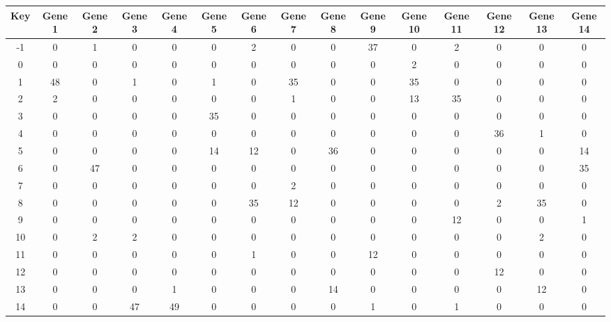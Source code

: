 \begin{tabular}{|c|c|c|c|c|c|c|c|c|c|c|c|c|c|c|}
\hline
Key & Gene 1 & Gene 2 & Gene 3 & Gene 4 & Gene 5 & Gene 6 & Gene 7 & Gene 8 & Gene 9 & Gene 10 & Gene 11 & Gene 12 & Gene 13 & Gene 14 \\
\hline
-1 & 0 & 1 & 0 & 0 & 0 & 2 & 0 & 0 & 37 & 0 & 2 & 0 & 0 & 0 \\
0 & 0 & 0 & 0 & 0 & 0 & 0 & 0 & 0 & 0 & 2 & 0 & 0 & 0 & 0 \\
1 & 48 & 0 & 1 & 0 & 1 & 0 & 35 & 0 & 0 & 35 & 0 & 0 & 0 & 0 \\
2 & 2 & 0 & 0 & 0 & 0 & 0 & 1 & 0 & 0 & 13 & 35 & 0 & 0 & 0 \\
3 & 0 & 0 & 0 & 0 & 35 & 0 & 0 & 0 & 0 & 0 & 0 & 0 & 0 & 0 \\
4 & 0 & 0 & 0 & 0 & 0 & 0 & 0 & 0 & 0 & 0 & 0 & 36 & 1 & 0 \\
5 & 0 & 0 & 0 & 0 & 14 & 12 & 0 & 36 & 0 & 0 & 0 & 0 & 0 & 14 \\
6 & 0 & 47 & 0 & 0 & 0 & 0 & 0 & 0 & 0 & 0 & 0 & 0 & 0 & 35 \\
7 & 0 & 0 & 0 & 0 & 0 & 0 & 2 & 0 & 0 & 0 & 0 & 0 & 0 & 0 \\
8 & 0 & 0 & 0 & 0 & 0 & 35 & 12 & 0 & 0 & 0 & 0 & 2 & 35 & 0 \\
9 & 0 & 0 & 0 & 0 & 0 & 0 & 0 & 0 & 0 & 0 & 12 & 0 & 0 & 1 \\
10 & 0 & 2 & 2 & 0 & 0 & 0 & 0 & 0 & 0 & 0 & 0 & 0 & 2 & 0 \\
11 & 0 & 0 & 0 & 0 & 0 & 1 & 0 & 0 & 12 & 0 & 0 & 0 & 0 & 0 \\
12 & 0 & 0 & 0 & 0 & 0 & 0 & 0 & 0 & 0 & 0 & 0 & 12 & 0 & 0 \\
13 & 0 & 0 & 0 & 1 & 0 & 0 & 0 & 14 & 0 & 0 & 0 & 0 & 12 & 0 \\
14 & 0 & 0 & 47 & 49 & 0 & 0 & 0 & 0 & 1 & 0 & 1 & 0 & 0 & 0 \\
\hline
\end{tabular}